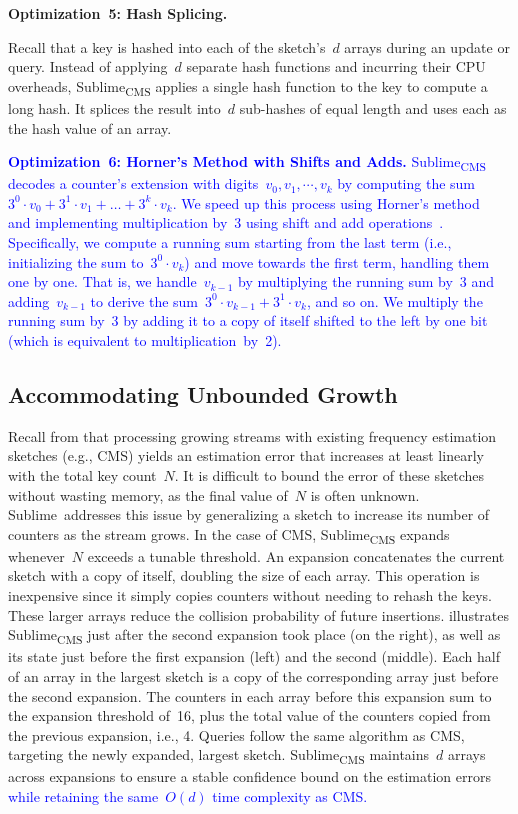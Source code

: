 \documentclass[sigconf]{acmart}
\newcommand{\sketch}{Sublime}
\newcommand{\sketchcms}{\sketch\textsubscript{CMS}\xspace}
\begin{document}
\hypertarget{optimization:hash_splicing}{\textbf{Optimization~5: Hash Splicing.}}
Recall that a key is hashed into each of the sketch's~$d$ arrays during an
update or query. Instead of applying~$d$ separate hash functions and incurring
their CPU overheads, \sketchcms applies a single hash function to the key to
compute a long hash. It splices the result into~$d$ sub-hashes of equal length
and uses each as the hash value of an array. 

\textcolor{blue}{
\hypertarget{optimization:horner_hack}{\textbf{Optimization~6: Horner's Method
with Shifts and Adds.}} \sketchcms decodes a counter's extension with
digits~$v_0, v_1, \cdots, v_k$ by computing the sum~$3^0 \cdot v_0 + 3^1 \cdot
v_1 + \dots + 3^k \cdot v_k$. We speed up this process using Horner's
method~\cite{Horner,HornerKnuth} and implementing multiplication by~3 using
shift and add operations~\cite{HackersDelight}. Specifically, we compute a
running sum starting from the last term (i.e., initializing the sum to~$3^0
\cdot v_k$) and move towards the first term, handling them one by one. That is,
we handle~$v_{k-1}$ by multiplying the running sum by~3 and adding~$v_{k-1}$ to
derive the sum~$3^0 \cdot v_{k-1} + 3^1 \cdot v_k$, and so on. We multiply the
running sum by~3 by adding it to a copy of itself shifted to the left by one
bit (which is equivalent to multiplication~by~2).
}


\subsection{Accommodating Unbounded Growth}\label{sec:accommodating_unknown_stream_lengths}
Recall from  that processing growing streams with
existing frequency estimation sketches (e.g., CMS) yields an estimation error
that increases at least linearly with the total key count~$N$. It is difficult
to bound the error of these sketches without wasting memory, as the final value
of~$N$ is often unknown. \sketch\ addresses this issue by generalizing a sketch
to increase its number of counters as the stream grows. In the case of CMS,
\sketchcms expands whenever~$N$ exceeds a tunable threshold. An expansion
concatenates the current sketch with a copy of itself, doubling the size of
each array. This operation is inexpensive since it simply copies counters
without needing to rehash the keys. These larger arrays reduce the collision
probability of future insertions.  illustrates
\sketchcms just after the second expansion took place (on the right), as well
as its state just before the first expansion (left) and the second (middle).
Each half of an array in the largest sketch is a copy of the corresponding
array just before the second expansion. The counters in each array before this
expansion sum to the expansion threshold of~16, plus the total value of the
counters copied from the previous expansion, i.e., 4. Queries follow the same
algorithm as CMS, targeting the newly expanded, largest sketch. \sketchcms
maintains~$d$ arrays across expansions to ensure a stable confidence bound on
the estimation errors \textcolor{blue}{while retaining the same~$O(d)$ time
complexity as CMS.}
\end{document}
